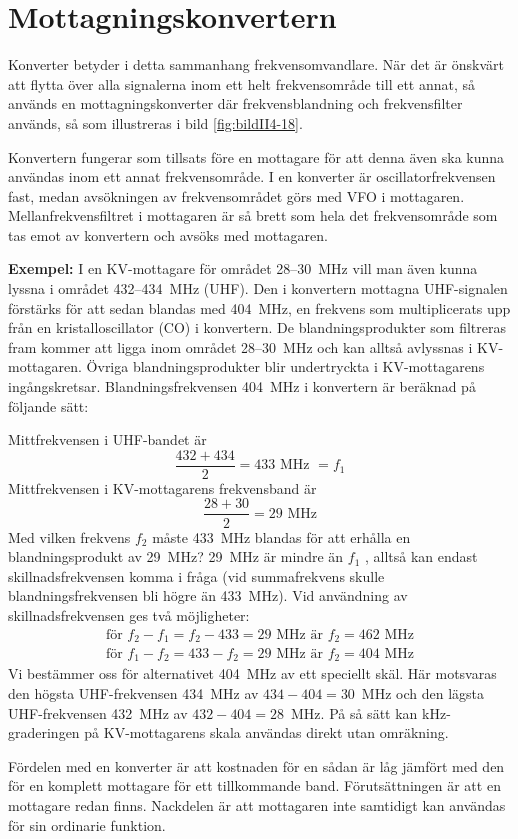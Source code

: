 \section{Mottagningskonvertern}


Konverter betyder i detta sammanhang frekvensomvandlare.
När det är önskvärt att flytta över alla signalerna inom ett helt frekvensområde
till ett annat, så används en mottagningskonverter där frekvensblandning och
frekvensfilter används, så som illustreras i bild \ref{fig:bildII4-18}.

Konvertern fungerar som tillsats före en mottagare för att denna även
ska kunna användas inom ett annat frekvensområde.
I en konverter är oscillatorfrekvensen fast, medan avsökningen av
frekvensområdet görs med VFO i mottagaren.
Mellanfrekvensfiltret i mottagaren är så brett som hela det frekvensområde
som tas emot av konvertern och avsöks med mottagaren.

\textbf{Exempel:}
I en KV-mottagare för området 28--30~MHz vill man även kunna lyssna i området
432--434~MHz (UHF).
Den i konvertern mottagna UHF-signalen förstärks för att sedan blandas med
404~MHz, en frekvens som multiplicerats upp från en kristalloscillator (CO) i
konvertern.
De blandningsprodukter som filtreras fram kommer att ligga inom området
28--30~MHz och kan alltså avlyssnas i KV-mottagaren.
Övriga blandningsprodukter blir undertryckta i KV-mottagarens ingångskretsar.
Blandningsfrekvensen \SI{404}{\mega\hertz} i konvertern är beräknad på följande
sätt:

\noindent
Mittfrekvensen i UHF-bandet är
\[\frac{432+434}{2} = 433\text{ MHz } = f_1\]
Mittfrekvensen i KV-mottagarens frekvensband är
\[\frac{28 + 30}{2} = 29\text{ MHz}\]
Med vilken frekvens \(f_2\) måste \SI{433}{\mega\hertz} blandas för att erhålla
en blandningsprodukt av \SI{29}{\mega\hertz}?
29~MHz är mindre än \(f_1\) , alltså kan endast skillnadsfrekvensen komma i
fråga (vid summafrekvens skulle blandningsfrekvensen bli högre än 433~MHz).
Vid användning av skillnadsfrekvensen ges två möjligheter:
\begin{gather*}
  \text{för }f_2 - f_1 = f_2 - 433 = 29\text{ MHz är }f_2 = 462\text{ MHz} \\
  \text{för }f_1 - f_2 = 433 - f_2 = 29\text{ MHz är }f_2 = 404\text{ MHz}
\end{gather*}
Vi bestämmer oss för alternativet \SI{404}{\mega\hertz} av ett speciellt skäl.
Här motsvaras den högsta UHF-frekvensen 434~MHz av \(434 - 404 = 30\)~MHz
och den lägsta UHF-frekvensen 432~MHz av \(432 - 404 = 28\)~MHz.
På så sätt kan kHz-graderingen på KV-mottagarens skala användas direkt utan
omräkning.

Fördelen med en konverter är att kostnaden för en sådan är låg jämfört
med den för en komplett mottagare för ett tillkommande band.
Förutsättningen är att en mottagare redan finns.
Nackdelen är att mottagaren inte samtidigt kan användas för sin
ordinarie funktion.
